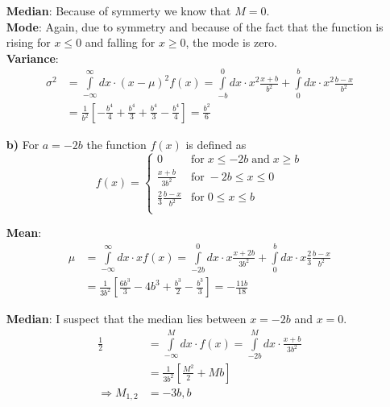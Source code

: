\documentclass[10pt]{article}
\newenvironment{myfont}{\fontfamily{put}\selectfont}{\par}
\begin{document}
\begin{myfont}
\begin{itemize}
  \noindent \textbf{Median}: Because of symmerty we know that $M = 0$. \\

  \noindent \textbf{Mode}: Again, due to symmetry and because of the fact that the function is rising for $x \leq 0$ and falling for $x \geq 0$, the mode is zero. \\

  \noindent \textbf{Variance}:
  \begin{align*}
  \sigma^{2} & = \int\limits_{-\infty}^{\infty}dx \cdot (x - \mu)^{2}f(x) = \int\limits_{-b}^{0}dx \cdot x^{2}\frac{x+b}{b^{2}} + \int\limits_{0}^{b}dx \cdot x^{2}\frac{b-x}{b^{2}} \\
             & = \frac{1}{b^{2}}\left[-\frac{b^{4}}{4} + \frac{b^{4}}{3} + \frac{b^{4}}{3} - \frac{b^{4}}{4}\right] = \frac{b^{2}}{6}
  \end{align*}

  \item[\textbf{b)}] For $a = -2b$ the function $f(x)$ is defined as
  $$
  f(x) = 
  \begin{cases}
  0                            & \textrm{for}\; x \leq -2b \; \textrm{and}\; x \geq b \\
  \frac{x+b}{3b^{2}}           & \textrm{for}\; -2b \leq x \leq 0 \\
  \frac{2}{3}\frac{b-x}{b^{2}} & \textrm{for}\; 0 \leq x \leq b \\
  \end{cases}
  $$

  \noindent \textbf{Mean}:
  \begin{align*}
  \mu & = \int\limits_{-\infty}^{\infty}dx \cdot xf(x) = \int\limits_{-2b}^{0}dx \cdot x\frac{x+2b}{3b^{2}} + \int\limits_{0}^{b}dx \cdot x\frac{2}{3}\frac{b-x}{b^{2}} \\
      & = \frac{1}{3b^{2}}\left[\frac{6b^{3}}{3} - 4b^{3} + \frac{b^{3}}{2} - \frac{b^{3}}{3}\right] = -\frac{11b}{18}
  \end{align*}


  \noindent \textbf{Median}: I suspect that the median lies between $x = -2b$ and $x = 0$.
  \begin{align*}
  \frac{1}{2}         & = \int\limits_{-\infty}^{M}dx \cdot f(x) = \int\limits_{-2b}^{M}dx \cdot \frac{x+b}{3b^{2}} \\
                      & = \frac{1}{3b^{2}} \left[\frac{M^{2}}{2} + Mb\right] \\
  \Rightarrow M_{1,2} & = -3b, b
  \end{align*}


\end{itemize}
\end{myfont}
\end{document}
